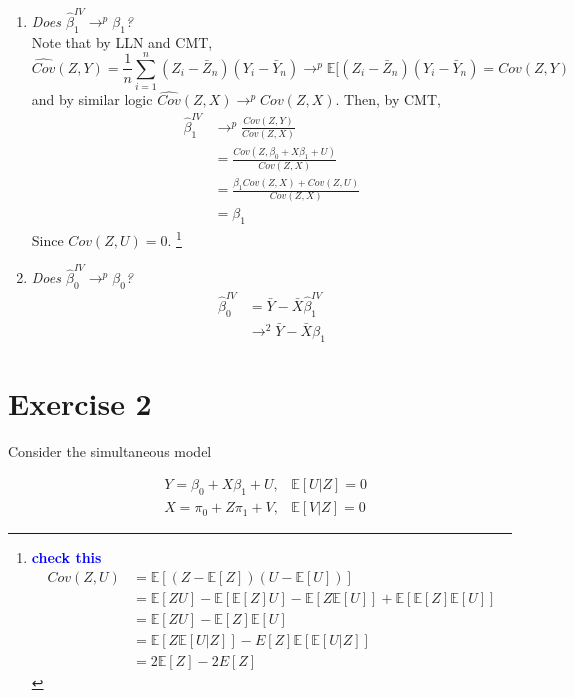 \documentclass[12pt,oneside,reqno]{amsart}
\newcommand{\E}{\mathbb{E}}
\newcommand{\sumin}{\sum\limits_{i=1}^n} %
\newcommand{\fix} [1] {\textbf{\textcolor{blue}{#1}}} %
\begin{document}
\begin{enumerate}[label = (\roman*)]

\item \textit{Does $\hat{\beta}_1^{IV} \rightarrow^p \beta_1$?} \\
Note that by LLN and CMT, 
\[\widehat{Cov}(Z,Y) = \frac{1}{n} \sumin(Z_i-\bar{Z}_n)(Y_i-\bar{Y}_n) \rightarrow^p \E[(Z_i-\bar{Z}_n)(Y_i-\bar{Y}_n) = Cov(Z,Y)\]  
and by similar logic $\widehat{Cov}(Z,X) \rightarrow^p Cov(Z,X)$. Then, by CMT, 
\begin{align*}
\hat{\beta}^{IV}_1 & \rightarrow^p \frac{Cov(Z,Y)}{Cov(Z,X)} 
\\
& = \frac{Cov(Z, \beta_0 +X\beta_1 +U)}
    {Cov(Z,X)} 
    \\
& = \frac{\beta_1Cov(Z,X) +Cov(Z,U)}
    {Cov(Z,X)} 
    \\
& = \beta_1
\end{align*}
Since $Cov(Z,U) = 0$.
\footnote{ \fix{check this}
\begin{align*}
Cov(Z,U) & = \E[(Z-\E[Z])(U-\E[U])] 
\\
& = \E[ZU] -\E[\E[Z]U] -\E[Z\E[U]] +\E[\E[Z]\E[U]]
\\
& = \E[ZU] -\E[Z]\E[U] 
\\
& = \E[Z\E[U|Z]] - E[Z]\E[\E[U|Z]] \\
& = 2\E[Z] - 2E[Z]
\end{align*}
}
\\


\item \textit{Does $\hat{\beta}_0^{IV} \rightarrow^p \beta_0$?}
\begin{align*}
\hat{\beta}_0^{IV} 
& = \bar{Y}-\bar{X}\hat{\beta}_1^{IV} 
\\
& \rightarrow^2 \bar{Y}-\bar{X}\beta_1
\end{align*}

\end{enumerate}



\section*{Exercise 2}

Consider the simultaneous model 

\begin{align*}
& Y = \beta_0+X\beta_1 +U, &\E[U|Z]= 0 
\\
& X = \pi_0 +Z\pi_1+V, & \E[V|Z] = 0
\end{align*}
\end{document}
